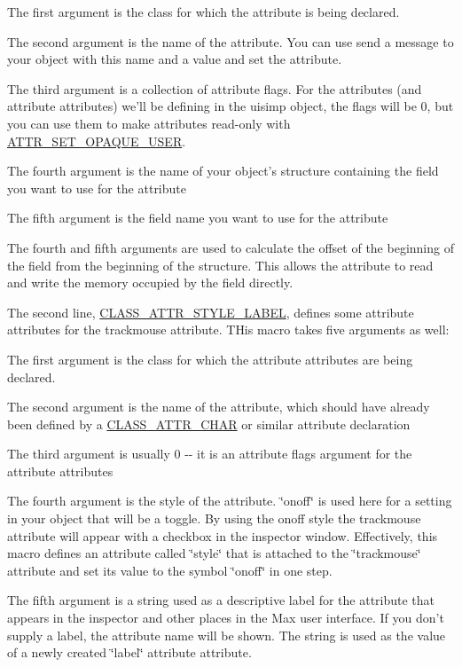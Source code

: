 \begin{DoxyItemize}
\item The first argument is the class for which the attribute is being declared.
\item The second argument is the name of the attribute. You can use send a message to your object with this name and a value and set the attribute.
\item The third argument is a collection of attribute flags. For the attributes (and attribute attributes) we'll be defining in the uisimp object, the flags will be 0, but you can use them to make attributes read-\/only with \hyperlink{group__attr_ggaf296cfc6741bb19207f6ed8062809115a82e9ec2c8a764eaa9f1fed1bcf611318}{ATTR\_\-SET\_\-OPAQUE\_\-USER}.
\item The fourth argument is the name of your object's structure containing the field you want to use for the attribute
\item The fifth argument is the field name you want to use for the attribute
\end{DoxyItemize}

The fourth and fifth arguments are used to calculate the offset of the beginning of the field from the beginning of the structure. This allows the attribute to read and write the memory occupied by the field directly.

The second line, \hyperlink{group__attr_ga1a55732bfe15aff297a7a025ce578d6e}{CLASS\_\-ATTR\_\-STYLE\_\-LABEL}, defines some attribute attributes for the trackmouse attribute. THis macro takes five arguments as well:


\begin{DoxyItemize}
\item The first argument is the class for which the attribute attributes are being declared.
\item The second argument is the name of the attribute, which should have already been defined by a \hyperlink{group__attr_ga155d0006cea5a22fe0832a9fa52b2814}{CLASS\_\-ATTR\_\-CHAR} or similar attribute declaration
\item The third argument is usually 0 -\/-\/ it is an attribute flags argument for the attribute attributes
\item The fourth argument is the style of the attribute. \char`\"{}onoff\char`\"{} is used here for a setting in your object that will be a toggle. By using the onoff style the trackmouse attribute will appear with a checkbox in the inspector window. Effectively, this macro defines an attribute called \char`\"{}style\char`\"{} that is attached to the \char`\"{}trackmouse\char`\"{} attribute and set its value to the symbol \char`\"{}onoff\char`\"{} in one step.
\item The fifth argument is a string used as a descriptive label for the attribute that appears in the inspector and other places in the Max user interface. If you don't supply a label, the attribute name will be shown. The string is used as the value of a newly created \char`\"{}label\char`\"{} attribute attribute.
\end{DoxyItemize}

